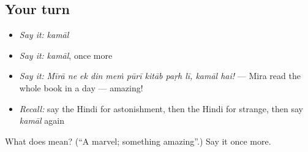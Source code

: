 \subsection*{Your turn}
\begin{itemize}
\raggedright
  \item \emph{Say it:} \emph{kamāl}
  \item \emph{Say it:} \emph{kamāl}, once more
  \item \emph{Say it:} \emph{Mīrā ne ek din meṁ pūrī kitāb paṛh lī, kamāl hai!} — Mira read the whole book in a day — amazing!
  \item \emph{Recall:} say the Hindi for astonishment, then the Hindi for strange, then say \emph{kamāl} again
\end{itemize}

\begin{tcolorbox}[breakable,colback=teal!4,colframe=teal!35!black,title={Before you move on}]
What does  mean? (\textquotedblleft{}A marvel; something amazing\textquotedblright{}.) Say it once more.
\end{tcolorbox}

